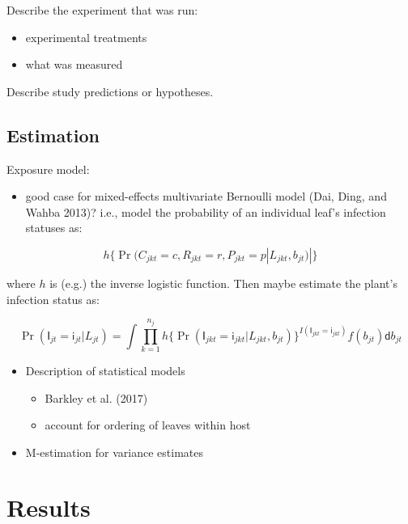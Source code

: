 \documentclass[]{article}
\providecommand{\tightlist}{%
  \setlength{\itemsep}{0pt}\setlength{\parskip}{0pt}}
\begin{document}
Describe the experiment that was run:

\begin{itemize}
\tightlist
\item
  experimental treatments
\item
  what was measured
\end{itemize}

Describe study predictions or hypotheses.

\hypertarget{estimation}{%
\subsection{Estimation}\label{estimation}}

Exposure model:

\begin{itemize}
\tightlist
\item
  good case for mixed-effects multivariate Bernoulli model (Dai, Ding,
  and Wahba 2013)? i.e., model the probability of an individual leaf's
  infection statuses as:
\end{itemize}

\[
h\{\Pr(C_{jkt} = c, R_{jkt}  = r, P_{jkt}  = p | L_{jkt}, b_{jt})|\}
\]

where \(h\) is (e.g.) the inverse logistic function. Then maybe estimate
the plant's infection status as:

\[
\Pr(\mathsf{I}_{jt} = \mathsf{i}_{jt} | L_{jt}) = \int \prod_{k = 1}^{n_j}h\{\Pr(\mathsf{I}_{jkt} = \mathsf{i}_{jkt}  | L_{jkt}, b_{jt})\}^{I(\mathsf{I}_{jkt} = \mathsf{i}_{jkt} )} f(b_{jt}) \mathsf{d}b_{jt}
\]

\begin{itemize}
\tightlist
\item
  Description of statistical models

  \begin{itemize}
  \tightlist
  \item
    Barkley et al. (2017)
  \item
    account for ordering of leaves within host
  \end{itemize}
\item
  M-estimation for variance estimates
\end{itemize}

\hypertarget{results}{%
\section{Results}\label{results}}
\end{document}
